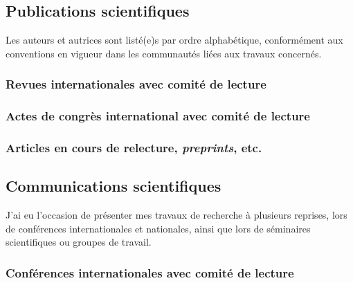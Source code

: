 \documentclass[12pt]{article}
\begin{document}
\subsection{Publications scientifiques}

Les auteurs et autrices sont listé(e)s par ordre alphabétique, conformément aux conventions en
vigueur dans les communautés liées aux travaux concernés.

\newcommand{\showbib}[1]{%
    \begin{otherlanguage}{english}
        \printbibliography[heading=none,keyword={#1}]
    \end{otherlanguage}}

\subsubsection*{Revues internationales avec comité de lecture}

\showbib{journals}

\subsubsection*{Actes de congrès international avec comité de lecture}

\showbib{international proceedings}

\subsubsection*{Articles en cours de relecture, \emph{preprints}, etc.}

\showbib{misc}

\subsection{Communications scientifiques}

J'ai eu l'occasion de présenter mes travaux de recherche à plusieurs reprises, lors de conférences
internationales et nationales, ainsi que lors de séminaires scientifiques ou groupes de travail.

\subsubsection*{Conférences internationales avec comité de lecture}
\end{document}
